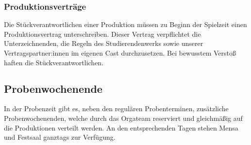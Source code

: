 \subsubsection{Produktionsverträge}
Die Stückverantwortlichen einer Produktion müssen zu Beginn der Spielzeit einen Produktionsvertrag unterschreiben. Dieser Vertrag verpflichtet die Unterzeichnenden, die Regeln des Studierendenwerks sowie unserer Vertragspartner:innen im eigenen Cast durchzusetzen. Bei bewusstem Verstoß haften die Stückverantwortlichen.


\subsection{Probenwochenende}
In der Probenzeit gibt es, neben den regulären Probenterminen, zusätzliche Probenwochenenden, welche durch das Orgateam reserviert und gleichmäßig auf die Produktionen verteilt werden. An den entsprechenden Tagen stehen Mensa und Festsaal ganztags zur Verfügung.

